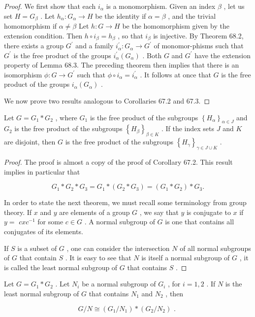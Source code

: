 \begin{proof}We first show that each \({i}_{\alpha }\) is a monomorphism. Given an index \(\beta\) , let us set \(H = {G}_{\beta }\) . Let \({h}_{\alpha } : {G}_{\alpha } \rightarrow  H\) be the identity if \(\alpha  = \beta\) , and the trivial homomorphism if \(\alpha  \neq  \beta\) Let \(h : G \rightarrow  H\) be the homomorphism given by the extension condition. Then \(h \circ  {i}_{\beta } = {h}_{\beta }\) , so that \({i}_{\beta }\) is injective.
By Theorem 68.2, there exists a group \({G}^{\prime }\) and a family \({i}_{\alpha }^{\prime } : {G}_{\alpha } \rightarrow  {G}^{\prime }\) of monomor-phisms such that \({G}^{\prime }\) is the free product of the groups \({i}_{\alpha }^{\prime }\left( {G}_{\alpha }\right)\) . Both \(G\) and \({G}^{\prime }\) have the extension property of Lemma 68.3. The preceding theorem then implies that there is an isomorphism \(\phi  : G \rightarrow  {G}^{\prime }\) such that \(\phi  \circ  {i}_{\alpha } = {i}_{\alpha }^{\prime }\) . It follows at once that \(G\) is the free product of the groups \({i}_{\alpha }\left( {G}_{\alpha }\right)\) .

We now prove two results analogous to Corollaries 67.2 and 67.3.
\end{proof}
\begin{corollary} Let \(G = {G}_{1} * {G}_{2}\) , where \({G}_{1}\) is the free product of the subgroups \({\left\{  {H}_{\alpha }\right\}  }_{\alpha  \in  J}\) and \({G}_{2}\) is the free product of the subgroups \({\left\{  {H}_{\beta }\right\}  }_{\beta  \in  K}\) . If the index sets \(J\) and \(K\) are disjoint, then \(G\) is the free product of the subgroups \({\left\{  {H}_{\gamma }\right\}  }_{\gamma  \in  J \cup  K}\) .
\end{corollary}

\begin{proof}The proof is almost a copy of the proof of Corollary 67.2.
This result implies in particular that

\[
{G}_{1} * {G}_{2} * {G}_{3} = {G}_{1} * \left( {{G}_{2} * {G}_{3}}\right)  = \left( {{G}_{1} * {G}_{2}}\right)  * {G}_{3}.
\]

In order to state the next theorem, we must recall some terminology from group theory. If \(x\) and \(y\) are elements of a group \(G\) , we say that \(y\) is conjugate to \(x\) if \(y =\)  \({cx}{c}^{-1}\) for some \(c \in  G\) . A normal subgroup of \(G\) is one that contains all conjugates of its elements.

If \(S\) is a subset of \(G\) , one can consider the intersection \(N\) of all normal subgroups of \(G\) that contain \(S\) . It is easy to see that \(N\) is itself a normal subgroup of \(G\) , it is called the least normal subgroup of \(G\) that contains \(S\) .
\end{proof}
\begin{theorem} Let \(G = {G}_{1} * {G}_{2}\) . Let \({N}_{i}\) be a normal subgroup of \({G}_{i}\) , for \(i = 1,2\) . If \(N\) is the least normal subgroup of \(G\) that contains \({N}_{1}\) and \({N}_{2}\) , then

\[
G/N \cong  \left( {{G}_{1}/{N}_{1}}\right)  * \left( {{G}_{2}/{N}_{2}}\right) \text{ . }
\]
\end{theorem}

